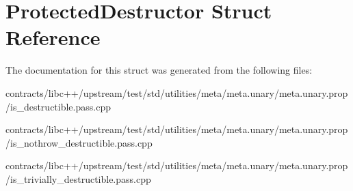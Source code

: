 \hypertarget{struct_protected_destructor}{}\section{Protected\+Destructor Struct Reference}
\label{struct_protected_destructor}


The documentation for this struct was generated from the following files\+:\begin{DoxyCompactItemize}
\item 
contracts/libc++/upstream/test/std/utilities/meta/meta.\+unary/meta.\+unary.\+prop/is\+\_\+destructible.\+pass.\+cpp\item 
contracts/libc++/upstream/test/std/utilities/meta/meta.\+unary/meta.\+unary.\+prop/is\+\_\+nothrow\+\_\+destructible.\+pass.\+cpp\item 
contracts/libc++/upstream/test/std/utilities/meta/meta.\+unary/meta.\+unary.\+prop/is\+\_\+trivially\+\_\+destructible.\+pass.\+cpp\end{DoxyCompactItemize}
